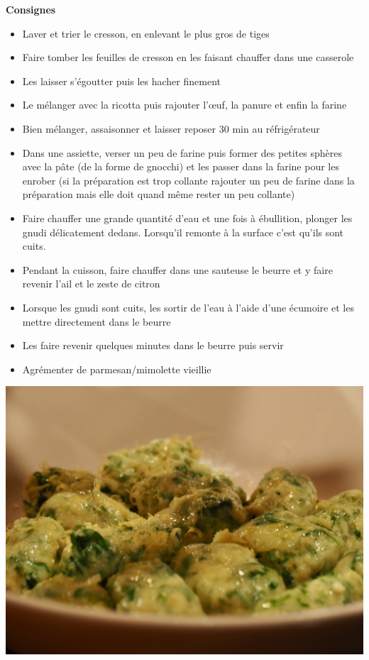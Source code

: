 \documentclass[]{book}
\providecommand{\tightlist}{%
  \setlength{\itemsep}{0pt}\setlength{\parskip}{0pt}}
\begin{document}
\textbf{Consignes}

\begin{itemize}
\tightlist
\item
  Laver et trier le cresson, en enlevant le plus gros de tiges
\item
  Faire tomber les feuilles de cresson en les faisant chauffer dans une casserole
\item
  Les laisser s'égoutter puis les hacher finement
\item
  Le mélanger avec la ricotta puis rajouter l'œuf, la panure et enfin la farine
\item
  Bien mélanger, assaisonner et laisser reposer 30 min au réfrigérateur
\item
  Dans une assiette, verser un peu de farine puis former des petites sphères avec la pâte (de la forme de gnocchi) et les passer dans la farine pour les enrober (si la préparation est trop collante rajouter un peu de farine dans la préparation mais elle doit quand même rester un peu collante)
\item
  Faire chauffer une grande quantité d'eau et une fois à ébullition, plonger les gnudi délicatement dedans. Lorsqu'il remonte à la surface c'est qu'ils sont cuits.
\item
  Pendant la cuisson, faire chauffer dans une sauteuse le beurre et y faire revenir l'ail et le zeste de citron
\item
  Lorsque les gnudi sont cuits, les sortir de l'eau à l'aide d'une écumoire et les mettre directement dans le beurre
\item
  Les faire revenir quelques minutes dans le beurre puis servir
\item
  Agrémenter de parmesan/mimolette vieillie
\end{itemize}

\begin{center}\includegraphics[width=0.9\linewidth]{photos/gnudi} \end{center}
\end{document}
